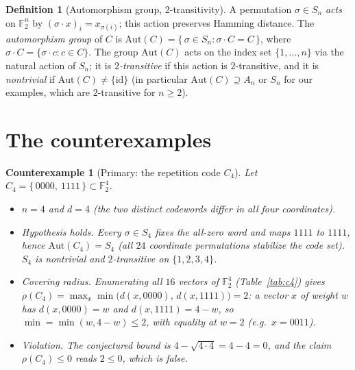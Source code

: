 \documentclass[11pt]{article}
\newtheorem{counterexample}{Counterexample}
\theoremstyle{definition}
\newtheorem{definition}{Definition}
\begin{document}
\begin{definition}[Automorphism group, 2-transitivity]
A permutation $\sigma \in S_n$ \emph{acts} on $\mathbb{F}_2^n$ by
$(\sigma \cdot x)_i = x_{\sigma(i)}$; this action preserves Hamming
distance. The \emph{automorphism group} of $C$ is
$\mathrm{Aut}(C) = \{\, \sigma \in S_n : \sigma \cdot C = C \,\}$,
where $\sigma \cdot C = \{\sigma \cdot c : c \in C\}$.
The group $\mathrm{Aut}(C)$ acts on the index set $\{1,\dots,n\}$ via the
natural action of $S_n$; it is \emph{$2$-transitive} if this action is
$2$-transitive, and it is \emph{nontrivial} if $\mathrm{Aut}(C) \neq
\{\mathrm{id}\}$ (in particular $\mathrm{Aut}(C) \supseteq A_n$ or $S_n$ for
our examples, which are $2$-transitive for $n \ge 2$).
\end{definition}

\section{The counterexamples}

\begin{counterexample}[Primary: the repetition code $C_4$]
\label{ex:c4}
Let $C_4 = \{\, 0000,\ 1111 \,\} \subset \mathbb{F}_2^4$.
\begin{itemize}
\item $n = 4$ and $d = 4$ (the two distinct codewords differ in all
four coordinates).
\item \emph{Hypothesis holds.} Every $\sigma \in S_4$ fixes the all-zero
word and maps $1111$ to $1111$, hence $\mathrm{Aut}(C_4) = S_4$
(all $24$ coordinate permutations stabilize the code set).
$S_4$ is nontrivial and $2$-transitive on $\{1,2,3,4\}$.
\item \emph{Covering radius.} Enumerating all $16$ vectors of
$\mathbb{F}_2^4$ (Table~\ref{tab:c4}) gives
$\rho(C_4) = \max_x \min\big(d(x,0000),\, d(x,1111)\big) = 2$:
a vector $x$ of weight $w$ has $d(x,0000) = w$ and $d(x,1111) = 4-w$, so
$\min = \min(w, 4-w) \le 2$, with equality at $w = 2$ (e.g.\ $x = 0011$).
\item \emph{Violation.} The conjectured bound is
$4 - \sqrt{4 \cdot 4} = 4 - 4 = 0$, and the claim $\rho(C_4) \le 0$
reads $2 \le 0$, which is false.
\end{itemize}
\end{counterexample}
\end{document}
